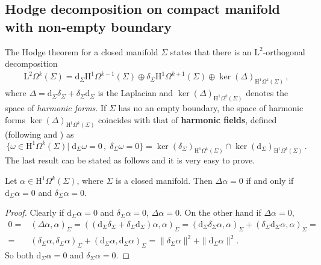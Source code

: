 \subsection{Hodge decomposition on compact manifold with non-empty boundary}
The Hodge theorem for a closed manifold $\Sigma$ states that there is an $\mathrm{L}^2$-orthogonal decomposition
\begin{align}\label{Eqn: Hodge decomposition on closed manifolds}
	\mathrm{L}^2\Omega^k(\Sigma)=\mathrm{d}_\Sigma \mathrm{H}^1\Omega^{k-1}(\Sigma)\oplus\delta_\Sigma \mathrm{H}^1\Omega^{k+1}(\Sigma)\oplus{\ker(\Delta)_{\mathrm{H}^1\Omega^k(\Sigma)}}\,,
\end{align}
where $\Delta=\mathrm{d}_\Sigma\delta_\Sigma+\delta_\Sigma\mathrm{d}_\Sigma$ is the Laplacian and $\ker(\Delta)_{\mathrm{H}^1\Omega^k(\Sigma)}$ denotes the space of \emph{harmonic forms}.
If $\Sigma$ has no an empty boundary, the space of harmonic forms $\ker(\Delta)_{\mathrm{H}^1\Omega^k(\Sigma)}$ coincides with that of \textbf{harmonic fields}, defined (following \cite{Kodaira-49} and \cite{Schwarz-95}) as
\begin{equation}
	{\lbrace\omega\in \mathrm{H}^1\Omega^k(\Sigma)|\;\mathrm{d}_\Sigma\omega=0\,,\;\delta_\Sigma\omega=0\rbrace}=\ker(\delta_\Sigma)_{\mathrm{H}^1\Omega^k(\Sigma)}\cap\ker(\mathrm{d}_\Sigma)_{\mathrm{H}^1\Omega^k(\Sigma)}\,.
\end{equation}
The last result can be stated as follows and it is very easy to prove.
\begin{proposition}
	Let $\alpha\in\mathrm{H}^1\Omega^k(\Sigma)$, where $\Sigma$ is a closed manifold. Then $\Delta\alpha=0$ if and only if $\mathrm{d}_\Sigma\alpha=0$ and $\delta_\Sigma\alpha=0$.
\end{proposition}
\begin{proof}
	Clearly if $\mathrm{d}_\Sigma\alpha=0$ and $\delta_\Sigma\alpha=0$, $\Delta\alpha=0$. On the other hand if $\Delta\alpha=0$,
	\begin{align}
		0=&\left(\Delta\alpha,\alpha\right)_\Sigma=\left((\mathrm{d}_\Sigma\delta_\Sigma+\delta_\Sigma\mathrm{d}_\Sigma)\alpha,\alpha\right)_\Sigma=\left(\mathrm{d}_\Sigma\delta_\Sigma\alpha,\alpha\right)_\Sigma+\left(\delta_\Sigma\mathrm{d}_\Sigma\alpha,\alpha\right)_\Sigma=\\
		=&\left(\delta_\Sigma\alpha,\delta_\Sigma\alpha\right)_\Sigma+\left(\mathrm{d}_\Sigma\alpha,\mathrm{d}_\Sigma\alpha\right)_\Sigma=\|\delta_\Sigma\alpha\|^2+\|\mathrm{d}_\Sigma\alpha\|^2.
	\end{align}
	So both $\mathrm{d}_\Sigma\alpha=0$ and $\delta_\Sigma\alpha=0$.
\end{proof}
